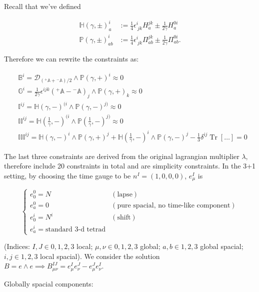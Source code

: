 \documentclass{article}
\begin{document}
Recall that we've defined

$$
\begin{aligned}
\mathbb{H}(\gamma, \pm)^i_a &:= \frac{1}{4} \epsilon^i_{\ jk} H^{jk}_a \pm \frac{1}{2\gamma} H^{0i}_a \\
\mathbb{P}(\gamma, \pm)^i_{ab} &:= \frac{1}{4} \epsilon^i_{\ jk} \Pi^{jk}_{ab} \pm \frac{1}{2\gamma} \Pi^{0i}_{ab}.
\end{aligned}
$$

Therefore we can rewrite the constraints as:

$$
\begin{aligned}
&\mathbb{B}^i = \mathcal{D}_{({}^{+}\mathbb{A} + {}^{-}\mathbb{A})/2} \wedge \mathbb{P}(\gamma, +)^i \approx 0 \\
&\mathbb{G}^i = \frac{1}{2\gamma} \epsilon^{ijk} ({}^{+}\mathbb{A} - {}^{-}\mathbb{A})_j \wedge \mathbb{P}(\gamma, +)_k \approx 0 \\
&\mathbb{I}^{ij} = \mathbb{H}(\gamma, -)^{(i} \wedge \mathbb{P}(\gamma, -)^{j)} \approx 0 \\
&\mathbb{II}^{ij} = \mathbb{H}\left(\frac{1}{\gamma}, -\right)^{(i} \wedge \mathbb{P}\left(\frac{1}{\gamma}, -\right)^{j)} \approx 0 \\
&\mathbb{III}^{ij} = \mathbb{H}(\gamma, -)^{i} \wedge \mathbb{P}(\gamma, +)^{j} + \mathbb{H}\left(\frac{1}{\gamma}, -\right)^{i} \wedge \mathbb{P}(\gamma, -)^{j} - \frac{1}{3} \delta^{ij} \operatorname{Tr}[\dots] = 0
\end{aligned}
$$

The last three constraints are derived from the original lagrangian multiplier $\lambda$, therefore include 20 constraints in total and are simplicity constraints. In the 3+1 setting, by choosing the time gauge to be $n^I = (1, 0, 0, 0)$, $e^I_\mu$ is

$$
\begin{cases}
e^0_0 = N & (\text{lapse}) \\
e^0_a = 0 & (\text{pure spacial, no time-like component}) \\
e^i_0 = N^i & (\text{shift}) \\
e^i_a = \text{standard 3-d tetrad}
\end{cases}
$$

(Indices: $I, J \in 0, 1, 2, 3$ local; $\mu, \nu \in 0, 1, 2, 3$ global; $a,b \in 1, 2, 3$ global spacial; $i,j \in 1, 2, 3$ local spacial).
We consider the solution $B = e \wedge e \implies B^{IJ}_{\mu\nu} = e^I_\mu e^J_\nu - e^J_\mu e^I_\nu$.

Globally spacial components:
\end{document}
